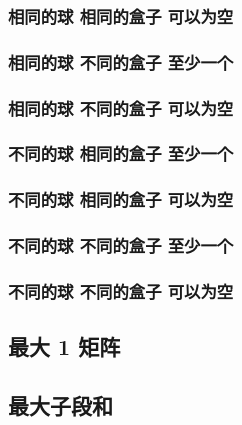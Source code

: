 \documentclass[a4paper]{article}
\begin{document}
\begin{CJK*}{UTF8}{gbsn}
\begin{multicols}{3}
\begin{flushleft}
\subsubsection{相同的球 相同的盒子 可以为空}


\subsubsection{相同的球 不同的盒子 至少一个}


\subsubsection{相同的球 不同的盒子 可以为空}


\subsubsection{不同的球 相同的盒子 至少一个}


\subsubsection{不同的球 相同的盒子 可以为空}


\subsubsection{不同的球 不同的盒子 至少一个}


\subsubsection{不同的球 不同的盒子 可以为空}



\subsection{最大 1 矩阵}


\subsection{最大子段和}



\end{flushleft}
\end{multicols}
\end{CJK*}
\end{document}
